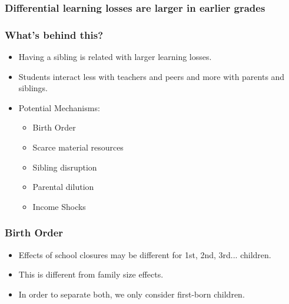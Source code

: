 \documentclass{beamer}
\begin{document}
\begin{frame}
    \label{frame:twfe_gpa_2_4_6_8}
    \frametitle{Differential learning losses are larger in earlier grades}
        {
    }
\end{frame}


\begin{frame}
    \label{frame:mechanisms}
    \frametitle{What's behind this?}
\begin{itemize}
    \item Having a sibling is related with larger learning losses.
    \item Students interact less with teachers and peers and more with parents and siblings.
    \item Potential Mechanisms:   
    \begin{itemize}
        \item Birth Order
        \item Scarce material resources
        \item Sibling disruption
        \item Parental dilution
        \item Income Shocks
    \end{itemize} 
\end{itemize}
\end{frame}

\begin{frame}
    \label{frame:birthorder}
    \frametitle{Birth Order}
       \begin{itemize}
           \item Effects of school closures may be different for 1st, 2nd, 3rd... children.
           \item This is different from family size effects.
           \item In order to separate both, we only consider first-born children.
       \end{itemize}
\end{frame}
\end{document}
